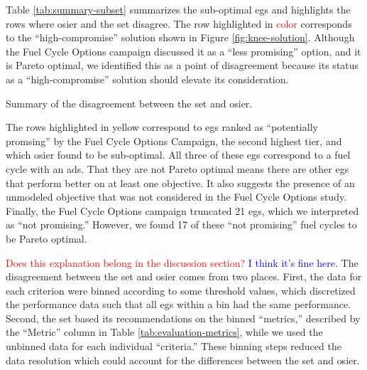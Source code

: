 Table \ref{tab:summary-subset} summarizes the sub-optimal \glspl{eg}
and highlights the rows where \gls{osier} and the \gls{set} disagree.
The row highlighted in \textcolor{red}{color} corresponds to the ``high-compromise''
solution shown in Figure \ref{fig:knee-solution}. Although the Fuel Cycle Options campaign
discussed it as a ``less promising'' option, and it is Pareto optimal, we identified this
as a point of disagreement because its status as a ``high-compromise'' solution 
should elevate its consideration.

\begin{table}[ht!]
    \centering
    \caption{Summary of the disagreement between the \gls{set} and 
        \gls{osier}.}
    \label{tab:summary-subset}
    \resizebox{\columnwidth}{!}{}
\end{table}

The rows highlighted in yellow correspond to \glspl{eg} ranked as ``potentially
promsing'' by the Fuel Cycle Options Campaign, the second highest tier, and which
\gls{osier} found to be sub-optimal. All three of these \glspl{eg} correspond to 
a fuel cycle with an \gls{ads}. That they are not Pareto optimal means there are 
other \glspl{eg} that perform better on at least one objective. It also suggests 
the presence of an unmodeled objective that was not considered in the Fuel Cycle
Options study. Finally, the Fuel Cycle Options campaign truncated 21 \glspl{eg},
which we interpreted as ``not promising.'' However, we found 17 of these ``not promising''
fuel cycles to be Pareto optimal.

\textcolor{red}{Does this explanation belong in the discussion section?}
\textcolor{blue}{I think it's fine here.}
The disagreement between the \gls{set} and \gls{osier} comes from two places. First,
the data for each criterion were binned according to some threshold values, which discretized
the performance data such that all \glspl{eg} within a bin had the same performance.
Second, 
the \gls{set} based its recommendations on the binned ``metrics,'' described by the 
``Metric'' column in Table \ref{tab:evaluation-metrics}, while we used the unbinned
data for each individual ``criteria.'' These binning steps reduced the data resolution which
could account for the differences between the \gls{set} and \gls{osier}.

